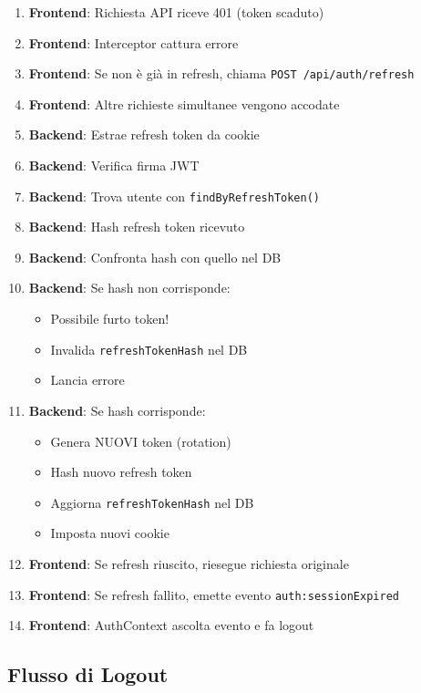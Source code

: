 \documentclass[11pt,a4paper]{article}
\newcommand{\code}[1]{\texttt{#1}}
\begin{document}
\begin{enumerate}
    \item \textbf{Frontend}: Richiesta API riceve 401 (token scaduto)
    \item \textbf{Frontend}: Interceptor cattura errore
    \item \textbf{Frontend}: Se non è già in refresh, chiama \code{POST /api/auth/refresh}
    \item \textbf{Frontend}: Altre richieste simultanee vengono accodate
    \item \textbf{Backend}: Estrae refresh token da cookie
    \item \textbf{Backend}: Verifica firma JWT
    \item \textbf{Backend}: Trova utente con \code{findByRefreshToken()}
    \item \textbf{Backend}: Hash refresh token ricevuto
    \item \textbf{Backend}: Confronta hash con quello nel DB
    \item \textbf{Backend}: Se hash non corrisponde:
        \begin{itemize}
            \item Possibile furto token!
            \item Invalida \code{refreshTokenHash} nel DB
            \item Lancia errore
        \end{itemize}
    \item \textbf{Backend}: Se hash corrisponde:
        \begin{itemize}
            \item Genera NUOVI token (rotation)
            \item Hash nuovo refresh token
            \item Aggiorna \code{refreshTokenHash} nel DB
            \item Imposta nuovi cookie
        \end{itemize}
    \item \textbf{Frontend}: Se refresh riuscito, riesegue richiesta originale
    \item \textbf{Frontend}: Se refresh fallito, emette evento \code{auth:sessionExpired}
    \item \textbf{Frontend}: AuthContext ascolta evento e fa logout
\end{enumerate}

\subsection{Flusso di Logout}
\end{document}
